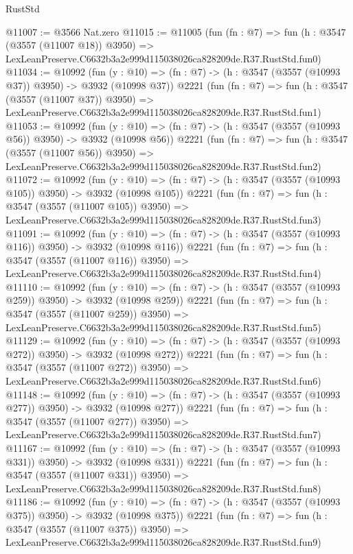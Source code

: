 \begin{lexlean}{RustStd}
\begin{coremodule}
@11007 := @3566 Nat.zero
@11015 := @11005
    (fun (fn : @7) =>
    fun (h : @3547 (@3557 (@11007 @18)) @3950) =>
    LexLeanPreserve.C6632b3a2e999d115038026ca828209de.R37.RustStd.fun0)
@11034 := @10992
    (fun (y : @10) => (fn : @7) -> (h : @3547 (@3557 (@10993 @37)) @3950) -> @3932 (@10998 @37))
    @2221
    (fun (fn : @7) =>
    fun (h : @3547 (@3557 (@11007 @37)) @3950) =>
    LexLeanPreserve.C6632b3a2e999d115038026ca828209de.R37.RustStd.fun1)
@11053 := @10992
    (fun (y : @10) => (fn : @7) -> (h : @3547 (@3557 (@10993 @56)) @3950) -> @3932 (@10998 @56))
    @2221
    (fun (fn : @7) =>
    fun (h : @3547 (@3557 (@11007 @56)) @3950) =>
    LexLeanPreserve.C6632b3a2e999d115038026ca828209de.R37.RustStd.fun2)
@11072 := @10992
    (fun (y : @10) => (fn : @7) -> (h : @3547 (@3557 (@10993 @105)) @3950) -> @3932 (@10998 @105))
    @2221
    (fun (fn : @7) =>
    fun (h : @3547 (@3557 (@11007 @105)) @3950) =>
    LexLeanPreserve.C6632b3a2e999d115038026ca828209de.R37.RustStd.fun3)
@11091 := @10992
    (fun (y : @10) => (fn : @7) -> (h : @3547 (@3557 (@10993 @116)) @3950) -> @3932 (@10998 @116))
    @2221
    (fun (fn : @7) =>
    fun (h : @3547 (@3557 (@11007 @116)) @3950) =>
    LexLeanPreserve.C6632b3a2e999d115038026ca828209de.R37.RustStd.fun4)
@11110 := @10992
    (fun (y : @10) => (fn : @7) -> (h : @3547 (@3557 (@10993 @259)) @3950) -> @3932 (@10998 @259))
    @2221
    (fun (fn : @7) =>
    fun (h : @3547 (@3557 (@11007 @259)) @3950) =>
    LexLeanPreserve.C6632b3a2e999d115038026ca828209de.R37.RustStd.fun5)
@11129 := @10992
    (fun (y : @10) => (fn : @7) -> (h : @3547 (@3557 (@10993 @272)) @3950) -> @3932 (@10998 @272))
    @2221
    (fun (fn : @7) =>
    fun (h : @3547 (@3557 (@11007 @272)) @3950) =>
    LexLeanPreserve.C6632b3a2e999d115038026ca828209de.R37.RustStd.fun6)
@11148 := @10992
    (fun (y : @10) => (fn : @7) -> (h : @3547 (@3557 (@10993 @277)) @3950) -> @3932 (@10998 @277))
    @2221
    (fun (fn : @7) =>
    fun (h : @3547 (@3557 (@11007 @277)) @3950) =>
    LexLeanPreserve.C6632b3a2e999d115038026ca828209de.R37.RustStd.fun7)
@11167 := @10992
    (fun (y : @10) => (fn : @7) -> (h : @3547 (@3557 (@10993 @331)) @3950) -> @3932 (@10998 @331))
    @2221
    (fun (fn : @7) =>
    fun (h : @3547 (@3557 (@11007 @331)) @3950) =>
    LexLeanPreserve.C6632b3a2e999d115038026ca828209de.R37.RustStd.fun8)
@11186 := @10992
    (fun (y : @10) => (fn : @7) -> (h : @3547 (@3557 (@10993 @375)) @3950) -> @3932 (@10998 @375))
    @2221
    (fun (fn : @7) =>
    fun (h : @3547 (@3557 (@11007 @375)) @3950) =>
    LexLeanPreserve.C6632b3a2e999d115038026ca828209de.R37.RustStd.fun9)

\end{coremodule}
\end{lexlean}
